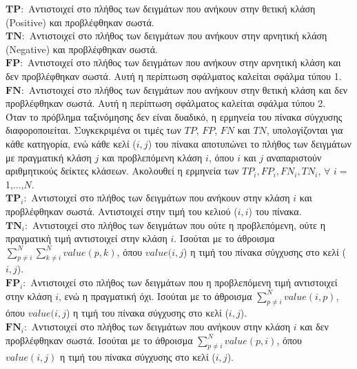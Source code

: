 \documentclass[12pt]{article}
\numberwithin{equation}{section}
\begin{document}
\noindent$\mathbf{TP: }$ Αντιστοιχεί στο πλήθος των δειγμάτων που ανήκουν στην θετική κλάση (Positive) και προβλέφθηκαν σωστά. \\

\noindent$\mathbf{TΝ: }$ Αντιστοιχεί στο πλήθος των δειγμάτων που ανήκουν στην αρνητική κλάση (Negative) και προβλέφθηκαν σωστά. \\

\noindent$\mathbf{FP: }$ Αντιστοιχεί στο πλήθος των δειγμάτων που ανήκουν στην αρνητική κλάση και δεν προβλέφθηκαν σωστά. Αυτή η περίπτωση σφάλματος καλείται σφάλμα τύπου 1. \\

\noindent$\mathbf{FΝ: }$ Αντιστοιχεί στο πλήθος των δειγμάτων που ανήκουν στην θετική κλάση και δεν προβλέφθηκαν σωστά. Αυτή η περίπτωση σφάλματος καλείται σφάλμα τύπου 2. \\

\noindent Όταν το πρόβλημα ταξινόμησης δεν είναι δυαδικό, η ερμηνεία του πίνακα σύγχυσης διαφοροποιείται. Συγκεκριμένα οι τιμές των \(TP\), \(FP\), \(FN\) και \(TN\), υπολογίζονται για κάθε κατηγορία, ενώ κάθε κελί (\(i,j\)) του πίνακα αποτυπώνει το πλήθος των δειγμάτων με πραγματική κλάση \(j\) και προβλεπόμενη κλάση \(i\), όπου  \(i\) και \(j\) αναπαριστούν αριθμητικούς δείκτες κλάσεων. Ακολουθεί η ερμηνεία των \(TP_i, FP_i, FN_i, TN_i\), \(\forall\) \(i =\) 1,...,\(N\). \\

\noindent $\mathbf{TP}_i:$ Αντιστοιχεί στο πλήθος των δειγμάτων που ανήκουν στην κλάση \(i\) και προβλέφθηκαν σωστά. Αντιστοιχεί στην τιμή του κελιού (\(i,i\)) του πίνακα.\\

\noindent $\mathbf{TN}_i:$ Αντιστοιχεί στο πλήθος των δειγμάτων που ούτε η προβλεπόμενη, ούτε η πραγματική τιμή αντιστοιχεί στην κλάση \(i\). Ισούται με το άθροισμα $\sum_{p \neq i}^{N} \sum_{k \neq i}^{N} value(p,k)$, όπου \(value(i,j\)) η τιμή του πίνακα σύγχυσης στο κελί (\(i,j\)). \\

\noindent $\mathbf{FP}_i:$ Αντιστοιχεί στο πλήθος των δειγμάτων που η προβλεπόμενη τιμή αντιστοιχεί στην κλάση \(i\), ενώ η πραγματική όχι. Ισούται με το άθροισμα $\sum_{p \neq i}^{N} value(i,p)$, όπου  \(value(i,j\)) η τιμή του πίνακα σύγχυσης στο κελί (\(i,j\)).\\

\noindent $\mathbf{FN}_i:$ Αντιστοιχεί στο πλήθος των δειγμάτων που ανήκουν στην κλάση \(i\) και δεν προβλέφθηκαν σωστά. Ισούται με το άθροισμα $\sum_{p \neq i}^{N} value(p,i)$, όπου \(value(i,j)\) η τιμή του πίνακα σύγχυσης στο κελί (\(i,j\)). \\
\end{document}
